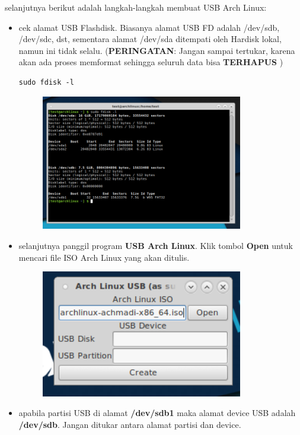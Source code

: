 \documentclass[12pt,]{article}
\begin{document}
	selanjutnya berikut adalah langkah-langkah membuat USB Arch Linux:
	\begin{itemize}
		\item cek alamat USB Flashdisk.
		Biasanya alamat USB FD adalah /dev/sdb, /dev/sdc, dst, sementara alamat /dev/sda ditempati oleh Hardisk lokal, namun ini tidak selalu.
		(\textbf{PERINGATAN}: Jangan sampai tertukar, karena akan ada proses memformat sehingga seluruh data bisa \textbf{TERHAPUS} )
		
		\begin{verbatim}
sudo fdisk -l
		\end{verbatim} 
		
		\newpage
		\begin{figure}[!ht]
			\centering
			\includegraphics[width=250pt]{usbarch/usb}
		\end{figure}
	
		\item selanjutnya panggil program \textbf{USB Arch Linux}.
		Klik tombol \textbf{Open} untuk mencari file ISO Arch Linux yang akan ditulis.
		
		\begin{figure}[!ht]
			\centering
			\includegraphics[width=250pt]{usbarch/step_1}
		\end{figure}
	
		\item apabila partisi USB di alamat \textbf{/dev/sdb1} maka alamat device USB adalah \textbf{/dev/sdb}.
		Jangan ditukar antara alamat partisi dan device.
		

\end{itemize}
\end{document}
